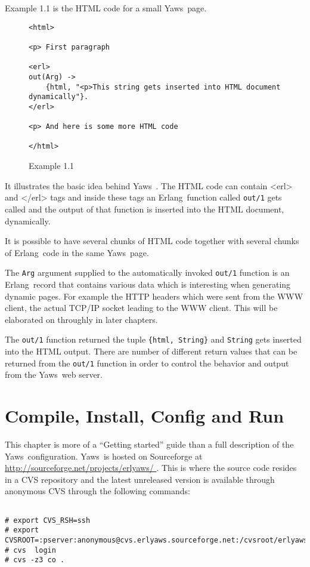 \documentclass[11pt,oneside,english]{book}
\newcommand{\Erlang}            %
        {{\sc Erlang}}
\newcommand{\Yaws}            %
        {{\sc Yaws}}
\begin{document}
Example 1.1 is the HTML code for a small \Yaws\  page.


\begin{figure}[h]
\begin{verbatim}
<html>

<p> First paragraph

<erl>
out(Arg) ->
    {html, "<p>This string gets inserted into HTML document dynamically"}.
</erl>

<p> And here is some more HTML code

</html>
\end{verbatim}
\caption{Example 1.1}
\end{figure}

It illustrates the basic idea behind \Yaws\ . The HTML code
can contain <erl> and </erl> tags and inside these tags an \Erlang\  function
called \verb+out/1+ gets called and the output of that function is inserted
into the HTML document, dynamically.

It is possible to have several chunks of HTML code together with several
chunks of \Erlang\  code in the same \Yaws\  page.

The \verb+Arg+ argument supplied to the automatically invoked \verb+out/1+
function is an \Erlang\  record that contains various data which is interesting
when generating dynamic pages. For example the HTTP headers which were sent
from the WWW client, the actual TCP/IP socket leading to the WWW client.
This will be elaborated on throughly in later chapters.

The \verb+out/1+ function returned the tuple \verb+{html, String}+ and
\verb+String+ gets inserted into the HTML output. There are number
of different return values that can be returned from the \verb+out/1+ function
in order to control the behavior and output from the \Yaws\  web server.



\chapter{Compile, Install, Config and Run}

This chapter is more of a ``Getting started'' guide than a full
description of the \Yaws\  configuration.
\Yaws\  is hosted on Sourceforge at
\url{ http://sourceforge.net/projects/erlyaws/ }. This is where the source code
resides in a CVS repository and the latest unreleased version is
available through anonymous CVS through the following commands:

\begin{verbatim}

# export CVS_RSH=ssh
# export CVSROOT=:pserver:anonymous@cvs.erlyaws.sourceforge.net:/cvsroot/erlyaws
# cvs  login
# cvs -z3 co .

\end{verbatim}
\end{document}
